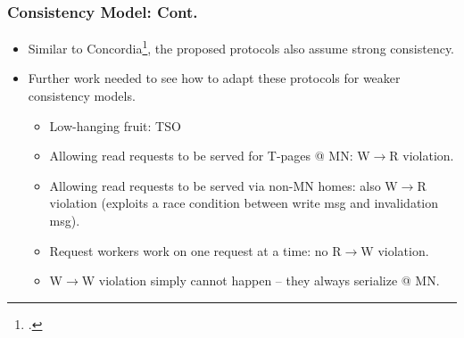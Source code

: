 \documentclass{beamer}
\begin{document}
\begin{frame}
    \frametitle{Consistency Model: Cont.}
    \begin{itemize}
        \item {
            Similar to Concordia\footcite{wang2021concordia}, the proposed protocols also assume
            strong consistency.
        }
        \item {
            Further work needed to see how to adapt these protocols for weaker consistency models.
            \begin{itemize}
                \item Low-hanging fruit: TSO
                \item Allowing read requests to be served for T-pages @ MN: W$\rightarrow$R violation.
                \item {
                    Allowing read requests to be served via non-MN homes: also W$\rightarrow$R violation
                    (exploits a race condition between write msg and invalidation msg).
                }
                \item Request workers work on one request at a time: no R$\rightarrow$W violation.
                \item W$\rightarrow$W violation simply cannot happen -- they always serialize @ MN.
            \end{itemize}
        }
    \end{itemize}
\end{frame}
\end{document}
